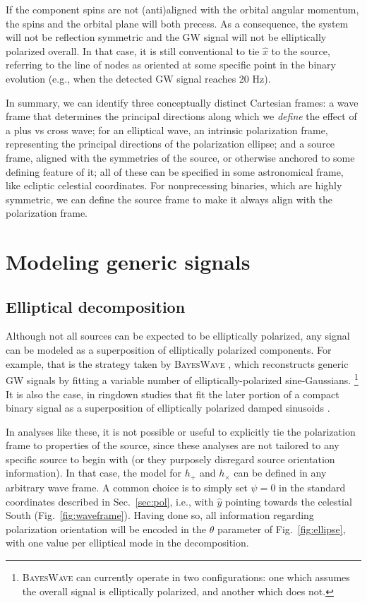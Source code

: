 \documentclass[aps,prd,twocolumn,superscriptaddress,preprintnumbers,floatfix,nofootinbib]{revtex4-2}
\newcommand*{\red}[1]{#1}
\newcommand*{\red}[1]{{\color{purple} #1}}
\begin{document}
If the component spins are not (anti)aligned with the orbital angular momentum, the spins and the orbital plane will both precess.
As a consequence, the system will not be reflection symmetric and the GW signal will not be elliptically polarized overall.
In that case, it is still conventional to tie $\hat{x}$ to the source, referring to the line of nodes as oriented at some specific point in the binary evolution (e.g., when the detected GW signal reaches 20 Hz).

In summary, we can identify three conceptually distinct Cartesian frames: a wave frame that determines the principal directions along which we \emph{define} the effect of a plus vs cross wave; for an elliptical wave, an intrinsic polarization frame, representing the principal directions of the polarization ellipse; and a source frame, aligned with the symmetries of the source, or otherwise anchored to some defining feature of it; all of these can be specified in some astronomical frame, like ecliptic celestial coordinates.
For nonprecessing binaries, which are highly symmetric, we can define the source frame to make it always align with the polarization frame.

\section{Modeling generic signals}

\subsection{Elliptical decomposition}

Although not all sources can be expected to be elliptically polarized, any signal can be modeled as a superposition of elliptically polarized components.
For example, that is the strategy taken by \textsc{BayesWave} \cite{Cornish:2014kda,Cornish:2020dwh}, which reconstructs generic GW signals by fitting a variable number of elliptically-polarized sine-Gaussians.%
\footnote{\textsc{BayesWave} can currently operate in two configurations: one which assumes the overall signal is elliptically polarized, and another which does not.}
It is also the case, in ringdown studies that fit the later portion of a compact binary signal as a superposition of elliptically polarized damped sinusoids \cite{Isi:2021iql}.

In analyses like these, it is not possible or useful to explicitly tie the polarization frame to properties of the source, since these analyses are not tailored to any specific source to begin with (or they purposely disregard source orientation information).
In that case, the model for $h_+$ and $h_\times$ can be defined in any arbitrary wave frame.
A common choice is to simply set $\psi = 0$ in the standard coordinates described in Sec.~\ref{sec:pol}, i.e., \red{with $\hat{y}$ pointing towards the celestial South} (Fig.~\ref{fig:waveframe}).
Having done so, all information regarding polarization orientation will be encoded in the $\theta$ parameter of Fig.~\ref{fig:ellipse}, with one value per elliptical mode in the decomposition.
\end{document}
